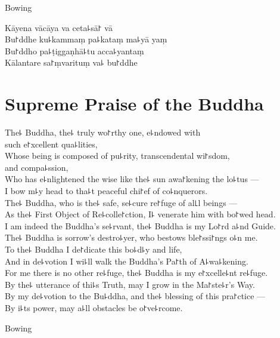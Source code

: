\begin{instruction}
  Bowing
\end{instruction}

Kāyena vācāya va ceta꜕sā꜓ vā\\
Bu꜓ddhe ku꜕kammaṃ pa꜕kataṃ ma꜕yā yaṃ\\
Bu꜓ddho pa꜕ṭiggaṇhā꜕tu acca꜕yantaṃ\\
Kālantare sa꜓ṃvarituṃ va꜕ bu꜓ddhe

\clearpage

\chapter{Supreme Praise of the Buddha}%

\begin{leader}
\end{leader}

The꜕ Buddha, the꜕ truly wo꜓rthy one, e꜕ndowed with\\
\vin such e꜓xcellent qua꜕lities,\\
Whose being is composed of pu꜕rity, transcendental wi꜓sdom,\\
\vin and compa꜕ssion,\\
Who has e꜕nlightened the wise like the꜕ sun awa꜓kening the lo꜕tus ---\\
I bow m꜕y head to tha꜕t peaceful chi꜓ef of co꜕nquerors.\\
The꜕ Buddha, who is the꜕ safe, se꜕cure re꜓fuge of al꜖l beings ---\\
As the꜕ First Object of Re꜕colle꜓ction, I꜕ venerate him with bo꜓wed head.\\
I am indeed the Buddha's se꜕rvant, the꜕ Buddha is my Lo꜓rd a꜕nd Guide.\\
The꜕ Buddha is sorrow's destro꜕yer, who bestows ble꜓ssi꜓ngs o꜕n me.\\
To the꜕ Buddha I de꜓dicate this bo꜕d꜕y and life,\\
And in de꜕votion I wi꜕ll walk the Buddha's Pa꜓th of A꜕wa꜕kening.\\
For me there is no other re꜕fuge, the꜕ Buddha is my e꜓xcelle꜕nt re꜕fuge.\\
By the꜕ utterance of thi꜕s Truth, may I grow in the Ma꜓ste꜕r's Way.\\
By my de꜕votion to the Bu꜕ddha, and the꜕ blessing of this pra꜓ctice ---\\
By i꜕ts power, may a꜕ll obstacles be o꜓ve꜕rcome.

\begin{instruction}
  Bowing
\end{instruction}

